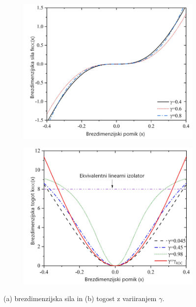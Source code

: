         \begin{figure}[!htb]
                \centering
                \begin{subfigure}{.500\textwidth}
                    \centering
                    \includegraphics[width=\linewidth]{Magisterski praktikum/slike/teorija/f(x).png}
                    \caption{}
                    \label{fig:f(x)}
                \end{subfigure}%
                \begin{subfigure}{.500\textwidth}
                    \centering
                    \includegraphics[width=\linewidth]{Magisterski praktikum/slike/teorija/k(x).png}
                    \caption{}
                    \label{fig:k(x)}
                \end{subfigure}%
                \caption{(a) brezdimenzijska sila in (b) togost z variiranjem $\gamma$.}
        \end{figure}


